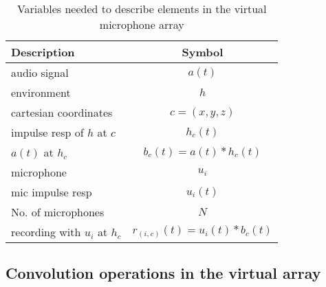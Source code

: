 \documentclass[14pt]{extarticle}
\begin{document}
\begin{table}
	\centering
	\begin{tabular}{l|c}
	
	Description & Symbol \\
	
	\hline
	audio signal & $a(t)$ \\
	
	\hline
	environment & $h$ \\
	
	\hline
	cartesian coordinates & $c=(x,y,z)$ \\
	
	\hline
	impulse resp of $h$ at $c$ & $h_c(t)$ \\
	
	\hline 
	$a(t)$ at $h_c$ & $b_c(t) = a(t) \ast h_c(t)$ \\
	
	\hline
	microphone & $u_i$ \\
	
	\hline
	mic impulse resp & $u_i(t)$ \\
	
	\hline
	No. of microphones & $N$ \\
	
	\hline
	recording with $u_i$ at $h_c$ & $r_{(i,c)}(t) = u_i(t) \ast b_c(t)$ \\ 
	
	\end{tabular}
	
	\caption{Variables needed to describe elements in the virtual microphone array}
	\label{tab:t1}
\end{table}

\subsection{Convolution operations in the virtual array}
\end{document}
